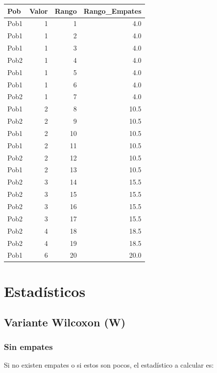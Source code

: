\documentclass[]{book}
\theoremstyle{definition}
\theoremstyle{definition}
\theoremstyle{definition}
\theoremstyle{remark}
\begin{document}
\begin{tabular}{l|r|r|r}
\hline
Pob & Valor & Rango & Rango\_Empates\\
\hline
Pob1 & 1 & 1 & 4.0\\
\hline
Pob1 & 1 & 2 & 4.0\\
\hline
Pob1 & 1 & 3 & 4.0\\
\hline
Pob2 & 1 & 4 & 4.0\\
\hline
Pob1 & 1 & 5 & 4.0\\
\hline
Pob1 & 1 & 6 & 4.0\\
\hline
Pob2 & 1 & 7 & 4.0\\
\hline
Pob1 & 2 & 8 & 10.5\\
\hline
Pob2 & 2 & 9 & 10.5\\
\hline
Pob1 & 2 & 10 & 10.5\\
\hline
Pob1 & 2 & 11 & 10.5\\
\hline
Pob2 & 2 & 12 & 10.5\\
\hline
Pob1 & 2 & 13 & 10.5\\
\hline
Pob2 & 3 & 14 & 15.5\\
\hline
Pob2 & 3 & 15 & 15.5\\
\hline
Pob2 & 3 & 16 & 15.5\\
\hline
Pob2 & 3 & 17 & 15.5\\
\hline
Pob2 & 4 & 18 & 18.5\\
\hline
Pob2 & 4 & 19 & 18.5\\
\hline
Pob1 & 6 & 20 & 20.0\\
\hline
\end{tabular}

\hypertarget{estadisticos}{%
\section{Estadísticos}\label{estadisticos}}

\hypertarget{variante-wilcoxon-w}{%
\subsection{Variante Wilcoxon (W)}\label{variante-wilcoxon-w}}

\hypertarget{sin-empates}{%
\subsubsection{Sin empates}\label{sin-empates}}

Si no existen empates o si estos son pocos, el estadístico a calcular
es:
\end{document}
